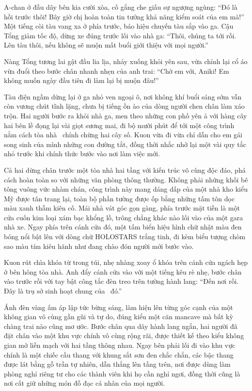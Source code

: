\documentclass[../main.tex]{subfiles}
\begin{document}
A-chan ở đầu dây bên kia cười xòa, cố gắng che giấu sự ngượng ngùng: ``Đó là hồi trước thôi! Bây giờ chị hoàn toàn tin tưởng khả năng kiểm soát của em mà!'' Một tiếng còi tàu vang xa ở phía trước, báo hiệu chuyến tàu sắp vào ga. Cậu Tổng giảm tốc độ, dừng xe đúng trước lối vào nhà ga: ``Thôi, chúng ta tới rồi. Lên tàu thôi, nếu không sẽ muộn mất buổi giới thiệu với mọi người.''

Nàng Tổng tương lai gật đầu lia lịa, nhảy xuống khỏi yên sau, vừa chỉnh lại cổ áo vừa đuổi theo bước chân nhanh nhẹn của anh trai: ``Chờ em với, Aniki! Em không muốn ngày đầu tiên đi làm lại bị muộn đâu!''

\ct

Tàu điện ngầm dừng lại ở ga nhỏ ven ngoại ô, nơi không khí buổi sáng sớm vẫn còn vương chút tĩnh lặng, chưa bị tiếng ồn ào của dòng người chen chân làm xáo trộn. Hai người bước ra khỏi nhà ga, men theo những con phố yên ả với hàng cây hai bên lề đọng lại vài giọt sương mai, đi bộ mười phút để tới một công trình nằm cách tòa nhà \hll\ chính chừng hai cây số. Kuon vừa đi vừa chỉ dẫn cho em gái song sinh của mình những con đường tắt, đồng thời nhắc nhở lại một vài quy tắc nhỏ trước khi chính thức bước vào nơi làm việc mới.

Cả hai dừng chân trước một tòa nhà hai tầng với kiến trúc vô cùng độc đáo, phá cách hoàn toàn so với những văn phòng thông thường. Không phải những khối bê tông vuông vức nhàm chán, công trình này mang dáng dấp của một nhà kho kiểu Mỹ được tân trang lại, toàn bộ phần tường được ốp bằng những tấm tôn dọc màu xanh thẫm kiên cố. Mái nhà vát góc gọn gàng, phía trước mặt tiền là một cửa cuốn kim loại xám bạc khổng lồ, trông chẳng khác nào lối vào của một gara nhà xe. Ngay phía trên cánh cửa đó, một tấm biển hiệu hình chữ nhật màu đen bóng nổi bật lên với dòng chữ HOLOSTARS trắng tinh, đi kèm biểu tượng chòm sao màu tím kiêu hãnh như đang chào đón người mới bước vào.


Kuon rút chìa khóa từ trong túi, nhẹ nhàng xoay ổ khóa trên cánh cửa ngách hẹp ở bên hông tòa nhà. Anh đẩy cánh cửa vào với một tiếng kêu rè nhẹ, bước chân vào trước rồi với tay bật công tắc đèn treo trên tường hành lang: ``Đến nơi rồi. Đây là trụ sở sinh hoạt chung của \hls\ đó.''

Ánh đèn vàng ấm áp lập tức bừng sáng, làm hiện lên từng góc cạnh của một không gian vô cùng gần gũi và tự do, đúng kiểu một căn mancave mà bất kỳ chàng trai nào cũng mơ ước. Bước chân qua dãy hành lang ngắn, hai người đã đặt chân vào một khu vực chính vô cùng rộng rãi, được thiết kế theo kiểu không gian mở liền mạch với hai tầng thông nhau. Ngay bên phải lối đi vào khu vực chính là một chiếc cầu thang với khung sắt sơn đen chắc chắn, các bậc thang được lát bằng gỗ trần tự nhiên, dẫn thẳng lên tầng trên, nơi được dùng làm phòng nghỉ riêng tư cho các thành viên khi họ cần nghỉ ngơi, đồng thời cũng là nơi cất giữ những món đồ đạc cá nhân của mọi người.
\end{document}
